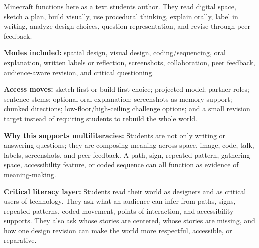 Minecraft functions here as a text students author. They read digital space, sketch a plan, build visually, use procedural thinking, explain orally, label in writing, analyze design choices, question representation, and revise through peer feedback.

\textbf{Modes included:} spatial design, visual design, coding/sequencing, oral explanation, written labels or reflection, screenshots, collaboration, peer feedback, audience-aware revision, and critical questioning.

\textbf{Access moves:} sketch-first or build-first choice; projected model; partner roles; sentence stems; optional oral explanation; screenshots as memory support; chunked directions; low-floor/high-ceiling challenge options; and a small revision target instead of requiring students to rebuild the whole world.

\textbf{Why this supports multiliteracies:} Students are not only writing or answering questions; they are composing meaning across space, image, code, talk, labels, screenshots, and peer feedback. A path, sign, repeated pattern, gathering space, accessibility feature, or coded sequence can all function as evidence of meaning-making.

\textcolor{LessonTwoAccent}{\textbf{Critical literacy layer:} Students read their world as designers and as critical users of technology. They ask what an audience can infer from paths, signs, repeated patterns, coded movement, points of interaction, and accessibility supports. They also ask whose stories are centered, whose stories are missing, and how one design revision can make the world more respectful, accessible, or reparative.}
